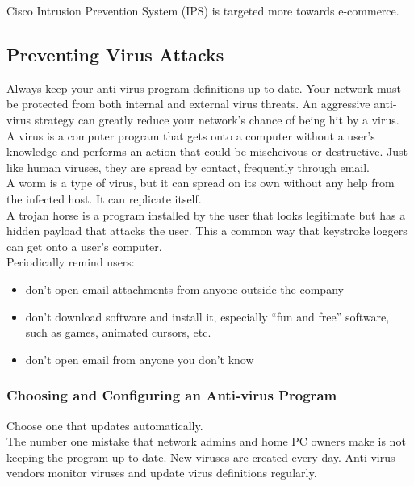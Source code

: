 Cisco Intrusion Prevention System (IPS) is targeted more towards e-commerce.

\subsection{Preventing Virus Attacks}

Always keep your anti-virus program definitions up-to-date. Your network
must be protected from both internal and external virus threats. An
aggressive anti-virus strategy can greatly reduce your network's chance
of being hit by a virus.\\

A virus is a computer program that gets onto a computer without a user's
knowledge and performs an action that could be mischeivous or destructive.
Just like human viruses, they are spread by contact, frequently through
email.\\

A worm is a type of virus, but it can spread on its own without any help
from the infected host. It can replicate itself.\\

A trojan horse is a program installed by the user that looks legitimate
but has a hidden payload that attacks the user. This a common way that
keystroke loggers can get onto a user's computer.\\

Periodically remind users:

\begin{itemize}

\item don't open email attachments from anyone outside the company

\item don't download software and install it, especially ``fun and free''
software, such as games, animated cursors, etc.

\item don't open email from anyone you don't know

\end{itemize}

\subsubsection{Choosing and Configuring an Anti-virus Program}

Choose one that updates automatically.\\

The number one mistake that network admins and home PC owners make is not
keeping the program up-to-date. New viruses are created every day. Anti-virus
vendors monitor viruses and update virus definitions regularly.\\

